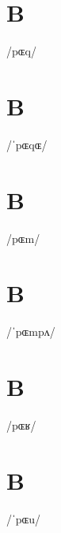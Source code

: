 \documentclass[10pt,a4paper,twoside]{book}
\begin{document}
\section*{B}

\begin{multicols}{3}
 {/pɶq/} {}
\end{multicols}

\section*{B}

\begin{multicols}{3}
 {/ˈpɶqɶ/} {}
\end{multicols}

\section*{B}

\begin{multicols}{3}
 {/pɶm/} {}
\end{multicols}

\section*{B}

\begin{multicols}{3}
 {/ˈpɶmpʌ/} {}
\end{multicols}

\section*{B}

\begin{multicols}{3}
 {/pɶʁ/} {}
\end{multicols}

\section*{B}

\begin{multicols}{3}
 {/ˈpɶu/} {}
\end{multicols}
\end{document}
